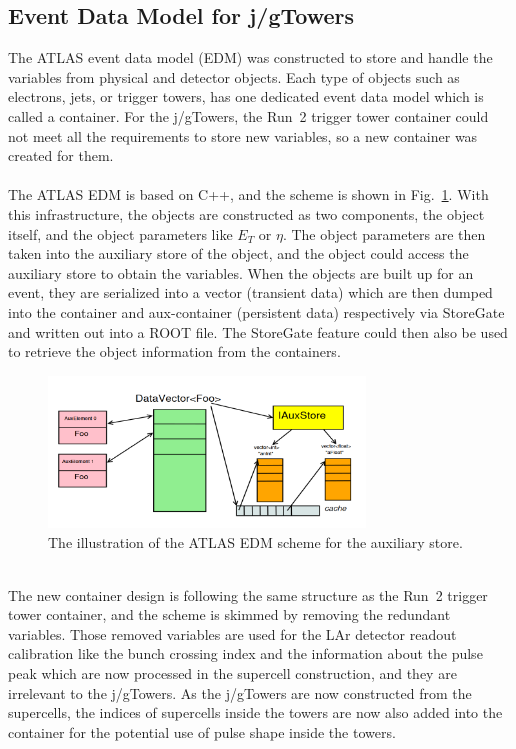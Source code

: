 \subsection{Event Data Model for j/gTowers}
The ATLAS event data model\cite{Buckley:2015tjh} (EDM) was constructed to store and handle the variables from physical and detector objects. Each type of objects such as electrons, jets, or trigger towers, has one dedicated event data model which is called a container. For the j/gTowers, the Run~2 trigger tower container could not meet all the requirements to store new variables, so a new container was created for them.
\\
\\The ATLAS EDM is based on C++, and the scheme is shown in Fig.~\ref{Fig:edm}. With this infrastructure, the objects are constructed as two components, the object itself, and the object parameters like $E_{T}$ or $\eta$. The object parameters are then taken into the auxiliary store of the object, and the object could access the auxiliary store to obtain the variables. When the objects are built up for an event, they are serialized into a vector (transient data) which are then dumped into the container and aux-container (persistent data) respectively via StoreGate\cite{Calafiura:2003gf} and written out into a ROOT file. The StoreGate feature could then also be used to retrieve the object information from the containers.
\begin{figure}[!h]                
	\includegraphics[width=0.75\textwidth]{Chapter6/EDM.png}
	\begin{center}
		\caption{The illustration of the ATLAS EDM scheme for the auxiliary store\cite{Buckley:2015tjh}.}
		\label{Fig:edm}            
	\end{center}
\end{figure}
\noindent
\\The new container design is following the same structure as the Run~2 trigger tower container, and the scheme is skimmed by removing the redundant variables. Those removed variables are used for the LAr detector readout calibration like the bunch crossing index and the information about the pulse peak which are now processed in the supercell construction, and they are irrelevant to the j/gTowers. As the j/gTowers are now constructed from the supercells, the indices of supercells inside the towers are now also added into the container for the potential use of pulse shape inside the towers. 
